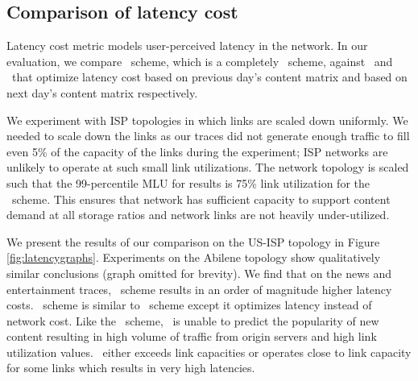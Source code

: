 



\subsection{Comparison of latency cost}

Latency cost metric models user-perceived latency in the network.  In our evaluation, we compare \invlru\ scheme, which is a completely \unplanned\ scheme,  against  \optrpl\ and \optrpfuturel\ that optimize latency cost based on previous day's content matrix and based on next day's content matrix respectively.


We experiment with ISP topologies in which links are scaled down uniformly.  We needed to scale down the links as our traces did not generate enough traffic to fill even 5\% of the capacity of the links during the experiment; ISP networks are unlikely to operate at such small link utilizations. The network topology is scaled such that the 99-percentile MLU for results is 75\% link utilization for the \invlru\ scheme.  This ensures that network has sufficient capacity to support content demand at all storage ratios and network links are not heavily under-utilized.

We present the results of our comparison on the US-ISP topology in Figure \ref{fig:latencygraphs}. Experiments on the Abilene topology show qualitatively similar conclusions (graph omitted for brevity). 
We find that on the news and entertainment traces, \optrpl\ scheme results in an order of magnitude higher latency costs. \optrpl\ scheme is similar to \optrp\ scheme except it optimizes latency instead of network cost.
Like the \optrp\ scheme, \optrpl\ is unable to predict the popularity of new content resulting in high volume of traffic from origin servers and high link utilization values. 
\optrpl\ either exceeds link capacities or operates close to link capacity for some links which results in  very high  latencies. 


